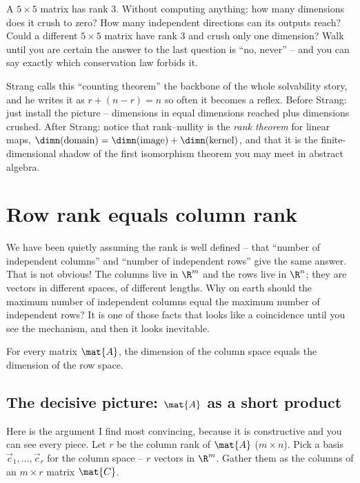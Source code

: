 \begin{walkbox}
A $5\times 5$ matrix has rank $3$. Without computing anything: how many dimensions
does it crush to zero? How many independent directions can its outputs reach?
Could a different $5\times 5$ matrix have rank $3$ and crush only one dimension?
Walk until you are certain the answer to the last question is ``no, never'' --
and you can say exactly which conservation law forbids it.
\end{walkbox}

\begin{strangbox}
Strang calls this ``counting theorem'' the backbone of the whole solvability
story, and he writes it as $r + (n-r) = n$ so often it becomes a reflex. Before
Strang: just install the picture -- dimensions in equal dimensions reached plus
dimensions crushed. After Strang: notice that rank--nullity is the
\emph{rank theorem} for linear maps, $\dimn(\text{domain}) =
\dimn(\text{image}) + \dimn(\text{kernel})$, and that it is the finite-dimensional
shadow of the first isomorphism theorem you may meet in abstract algebra.
\end{strangbox}

\section{Row rank equals column rank}

We have been quietly assuming the rank is well defined -- that ``number of
independent columns'' and ``number of independent rows'' give the same answer.
That is not obvious! The columns live in $\R^m$ and the rows live in $\R^n$;
they are vectors in different spaces, of different lengths. Why on earth should
the maximum number of independent columns equal the maximum number of independent
rows? It is one of those facts that looks like a coincidence until you see the
mechanism, and then it looks inevitable.

\begin{theorem}[Row rank $=$ Column rank]\label{ch16:row-col}
For every matrix $\mat{A}$, the dimension of the column space equals the dimension
of the row space.
\end{theorem}

\subsection{The decisive picture: $\mat{A}$ as a short product}

Here is the argument I find most convincing, because it is constructive and you
can see every piece. Let $r$ be the column rank of $\mat{A}$ ($m\times n$). Pick a
basis $\vec{c}_1,\dots,\vec{c}_r$ for the column space -- $r$ vectors in $\R^m$.
Gather them as the columns of an $m \times r$ matrix $\mat{C}$.

